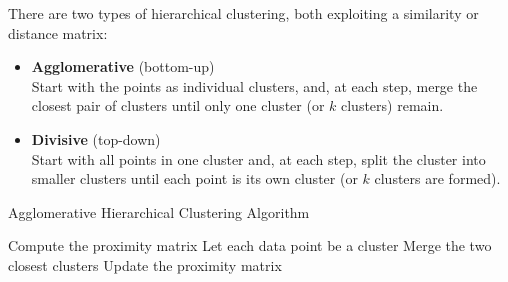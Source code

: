 There are two types of hierarchical clustering, both exploiting a similarity or distance matrix:
\begin{itemize}
	\item \textbf{Agglomerative} (bottom-up)\\
	Start with the points as individual clusters, and, at each step, merge the closest pair of clusters until only one cluster (or $k$ clusters) remain.
	\item \textbf{Divisive} (top-down)\\
	Start with all points in one cluster and, at each step, split the cluster into smaller clusters until each point is its own cluster (or $k$ clusters are formed).
\end{itemize}
\begin{algorithm}[H]
\caption{Agglomerative Hierarchical Clustering Algorithm}
\begin{algorithmic}[1]
\State Compute the proximity matrix
\State Let each data point be a cluster
\Repeat
\State Merge the two closest clusters
\State Update the proximity matrix
\end{algorithmic}
\end{algorithm}


